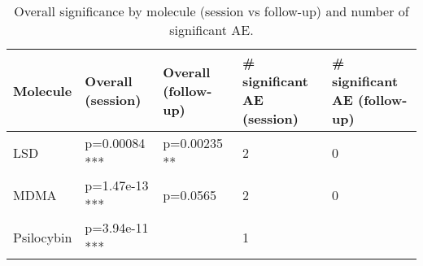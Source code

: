 \begin{table}[ht]
\centering
\caption{Overall significance by molecule (session vs follow-up) and number of significant AE.}
\label{tab:cmp_topline}
\begin{tabular}{lllll}
\toprule
Molecule & Overall (session) & Overall (follow-up) & # significant AE (session) & # significant AE (follow-up) \\
\midrule
LSD & p=0.00084 *** & p=0.00235 ** & 2 &  0 \\
MDMA & p=1.47e-13 *** & p=0.0565  & 2 &  0 \\
Psilocybin & p=3.94e-11 *** &  & 1 &  \\
\bottomrule
\end{tabular}
\end{table}

